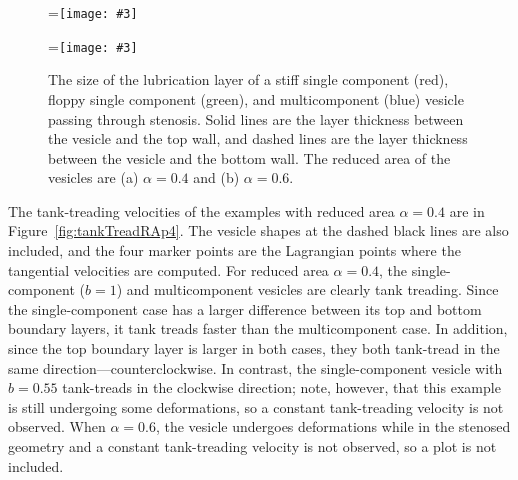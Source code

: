 \documentclass[twoside,twocolumn,9pt]{article}
\newcommand{\subfigimg}[3][,]{%
  \setbox1=\hbox{\texttt{[image: \#3]}}%
  \leavevmode\rlap{\usebox1}%
  \rlap{\hspace*{0pt}\raisebox{\dimexpr\ht1-0\baselineskip}{\bf
  \normalsize #2}}%
  \phantom{\usebox1}%
}
\begin{document}
\begin{figure}[h]
    \centering
    \subfigimg[width = 0.49\columnwidth]{(a)}{figures/Layer_Size_RAp4.pdf}
    \subfigimg[width = 0.49\columnwidth]{(b)}{figures/Layer_Size_RAp6.pdf}
    \caption{\label{fig:lubrication} \small The size of the lubrication
    layer of a stiff single component (red), floppy single component
    (green), and multicomponent (blue) vesicle passing through stenosis.
    Solid lines are the layer thickness between the vesicle and the top
    wall, and dashed lines are the layer thickness between the vesicle
    and the bottom wall. The reduced area of the vesicles are (a)
    $\alpha = 0.4$ and (b) $\alpha = 0.6$.}
\end{figure}

The tank-treading velocities of the examples with reduced area $\alpha = 0.4$ are in Figure~\ref{fig:tankTreadRAp4}. The vesicle shapes at the dashed black lines are also included, and the four marker points are the Lagrangian points where the tangential velocities are computed. For reduced area $\alpha = 0.4$, the single-component ($b=1$) and multicomponent vesicles are clearly tank treading. Since the single-component case has a larger difference between its top and bottom boundary layers, it tank treads faster than the multicomponent case. In addition, since the top boundary layer is larger in both cases, they both tank-tread in the same direction---counterclockwise. In contrast, the single-component vesicle with $b=0.55$ tank-treads in the clockwise direction; note, however, that this example is still undergoing some deformations, so a constant tank-treading velocity is not observed. When $\alpha = 0.6$, the vesicle undergoes deformations while in the stenosed geometry and a constant tank-treading velocity is not observed, so a plot is not included. 

\end{document}
